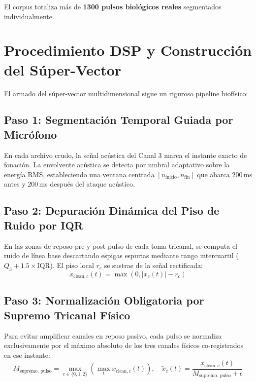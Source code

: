 \documentclass[11pt,a4paper,openany]{book}
\theoremstyle{definition}
\begin{document}
El corpus totaliza más de \textbf{1300 pulsos biológicos reales} segmentados individualmente.

\section{Procedimiento DSP y Construcción del Súper-Vector}

El armado del súper-vector multidimensional sigue un riguroso pipeline biofísico:

\subsection{Paso 1: Segmentación Temporal Guiada por Micrófono}
En cada archivo crudo, la señal acústica del Canal 3 marca el instante exacto de fonación. La envolvente acústica se detecta por umbral adaptativo sobre la energía RMS, estableciendo una ventana centrada $[n_{\text{inicio}}, n_{\text{fin}}]$ que abarca 200\,ms antes y 200\,ms después del ataque acústico.

\subsection{Paso 2: Depuración Dinámica del Piso de Ruido por IQR}
En las zonas de reposo pre y post pulso de cada toma tricanal, se computa el ruido de línea base descartando espigas espurias mediante rango intercuartil ($Q_3 + 1.5 \times \text{IQR}$). El piso local $r_c$ se sustrae de la señal rectificada:
\begin{equation}
x_{\text{clean}, c}(t) = \max(0, |x_c(t)| - r_c)
\end{equation}

\subsection{Paso 3: Normalización Obligatoria por Supremo Tricanal Físico}
Para evitar amplificar canales en reposo pasivo, cada pulso se normaliza exclusivamente por el máximo absoluto de los tres canales físicos co-registrados en ese instante:
\begin{equation}
M_{\text{supremo, pulso}} = \max_{c \in \{0, 1, 2\}} \left( \max_t x_{\text{clean}, c}(t) \right), \quad \tilde{x}_c(t) = \frac{x_{\text{clean}, c}(t)}{M_{\text{supremo, pulso}} + \epsilon}
\end{equation}
\end{document}

